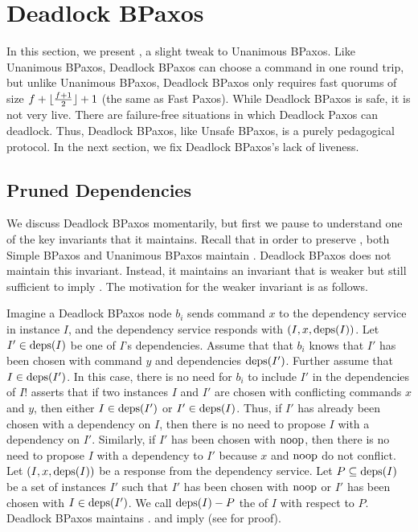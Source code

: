 \section{Deadlock BPaxos}
In this section, we present , a slight tweak to
Unanimous BPaxos. Like Unanimous BPaxos, Deadlock BPaxos can choose a command
in one round trip, but unlike Unanimous BPaxos, Deadlock BPaxos only requires
fast quorums of size $f + \lfloor\frac{f + 1}{2}\rfloor + 1$ (the same as Fast Paxos).
%
While Deadlock BPaxos is safe, it is not very live. There are failure-free
situations in which Deadlock Paxos can deadlock. Thus, Deadlock BPaxos, like
Unsafe BPaxos, is a purely pedagogical protocol. In the next section, we fix
Deadlock BPaxos's lack of liveness.

\subsection{Pruned Dependencies}
We discuss Deadlock BPaxos momentarily, but first we pause to understand one of
the key invariants that it maintains. Recall that in order to preserve
, both Simple BPaxos and Unanimous BPaxos maintain
.
%
Deadlock BPaxos does not maintain this invariant. Instead, it maintains an
invariant that is weaker but still sufficient to imply
. The motivation for the weaker invariant is as
follows.

Imagine a Deadlock BPaxos node $b_i$ sends command $x$ to the dependency
service in instance $I$, and the dependency service responds with $(I, x,
\text{deps}(I))$. Let $I' \in \text{deps}(I)$ be one of $I$'s dependencies. Assume that
that $b_i$ knows that $I'$ has been chosen with command $y$ and dependencies
$\text{deps}(I')$. Further assume that $I \in \text{deps}(I')$. In this case, there is no
need for $b_i$ to include $I'$ in the dependencies of $I$!
 asserts that if two instances $I$ and $I'$ are
chosen with conflicting commands $x$ and $y$, then either $I \in \text{deps}(I')$ or
$I' \in \text{deps}(I)$. Thus, if $I'$ has already been chosen with a dependency on
$I$, then there is no need to propose $I$ with a dependency on $I'$.
%
Similarly, if $I'$ has been chosen with $\text{noop}$, then there is no need to
propose $I$ with a dependency to $I'$ because $x$ and $\text{noop}$ do not conflict.
%
Let $(I, x, \text{deps}(I))$ be a response from the dependency service. Let $P
\subseteq \text{deps}(I)$ be a set of instances $I'$ such that $I'$ has been chosen
with $\text{noop}$ or $I'$ has been chosen with $I \in \text{deps}(I')$. We call $\text{deps}(I)
- P$ the  of $I$ with respect to $P$. Deadlock
BPaxos maintains .  and
 imply  (see
 for proof).


